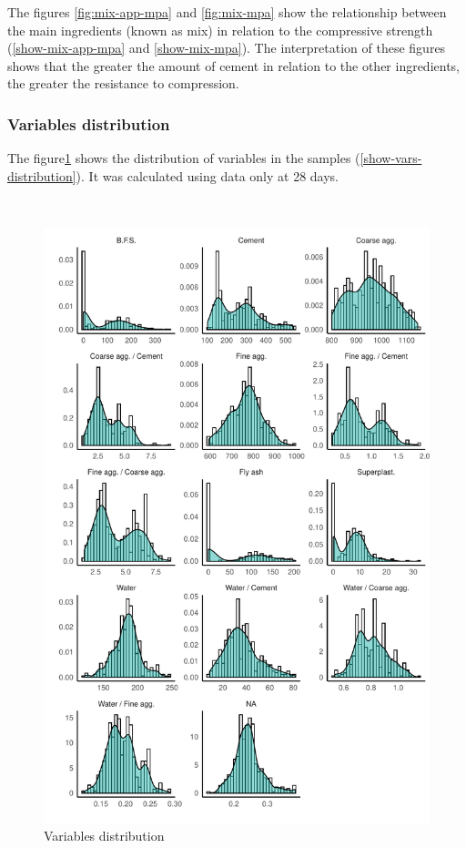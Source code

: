 \documentclass[]{article}
\begin{document}
The figures \ref{fig:mix-app-mpa} and \ref{fig:mix-mpa} show the
relationship between the main ingredients (known as mix) in relation to
the compressive strength (\ref{show-mix-app-mpa} and
\ref{show-mix-mpa}). The interpretation of these figures shows that the
greater the amount of cement in relation to the other ingredients, the
greater the resistance to compression.

\hypertarget{variables-distribution}{%
\subsubsection{Variables distribution}\label{variables-distribution}}

The figure\ref{fig:vars-distribution} shows the distribution of
variables in the samples (\ref{show-vars-distribution}). It was
calculated using data only at 28 days.

~

\begin{figure}

{\centering \includegraphics{CopyOfcapstone_files/figure-latex/vars-distribution-1} 

}

\caption{Variables distribution}\label{fig:vars-distribution}
\end{figure}
\end{document}

